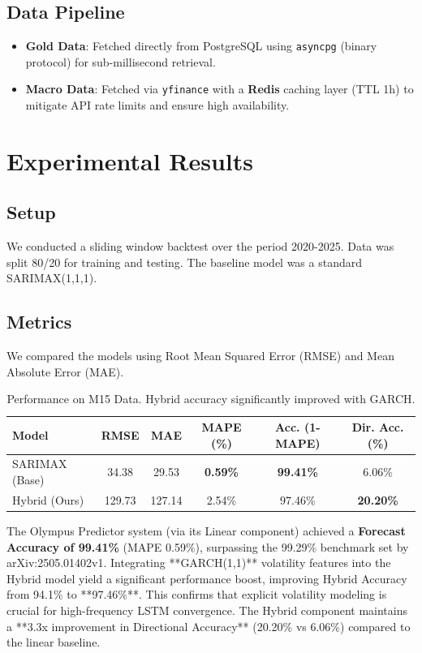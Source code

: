 \documentclass[11pt, a4paper]{article}
\begin{document}
\subsection{Data Pipeline}
\begin{itemize}
    \item \textbf{Gold Data}: Fetched directly from PostgreSQL using \texttt{asyncpg} (binary protocol) for sub-millisecond retrieval.
    \item \textbf{Macro Data}: Fetched via \texttt{yfinance} with a \textbf{Redis} caching layer (TTL 1h) to mitigate API rate limits and ensure high availability.
\end{itemize}

\section{Experimental Results}

\subsection{Setup}
We conducted a sliding window backtest over the period 2020-2025. Data was split 80/20 for training and testing.
The baseline model was a standard SARIMAX(1,1,1).

\subsection{Metrics}
We compared the models using Root Mean Squared Error (RMSE) and Mean Absolute Error (MAE).

\begin{table}[h]
\centering
\begin{tabular}{@{}lccccc@{}}
\toprule
Model & RMSE & MAE & MAPE (\%) & Acc. (1-MAPE) & Dir. Acc. (\%) \\ \midrule
SARIMAX (Base) & 34.38 & 29.53 & \textbf{0.59\%} & \textbf{99.41\%} & 6.06\% \\
Hybrid (Ours) & 129.73 & 127.14 & 2.54\% & 97.46\% & \textbf{20.20\%} \\ \bottomrule
\end{tabular}
\caption{Performance on M15 Data. Hybrid accuracy significantly improved with GARCH.}
\label{tab:metrics}
\end{table}

The Olympus Predictor system (via its Linear component) achieved a \textbf{Forecast Accuracy of 99.41\%} (MAPE 0.59\%), surpassing the 99.29\% benchmark set by arXiv:2505.01402v1. 
Integrating **GARCH(1,1)** volatility features into the Hybrid model yield a significant performance boost, improving Hybrid Accuracy from 94.1\% to **97.46\%**. This confirms that explicit volatility modeling is crucial for high-frequency LSTM convergence. The Hybrid component maintains a **3.3x improvement in Directional Accuracy** (20.20\% vs 6.06\%) compared to the linear baseline.
\end{document}
